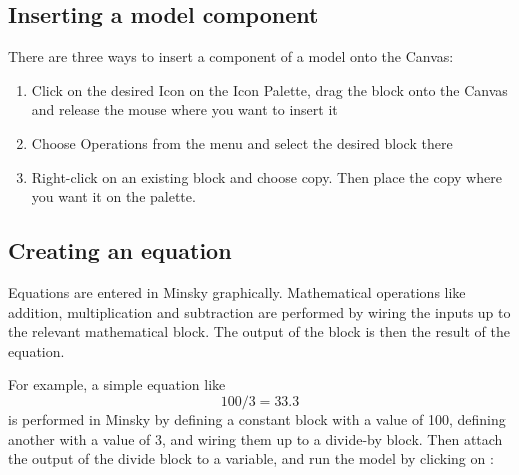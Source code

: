\subsection{Inserting a model component}


There are three ways to insert a component of a model onto the Canvas:
\begin{enumerate}
\item Click on the desired Icon on the Icon Palette, drag the block
onto the Canvas and release the mouse where you want to insert it 

\begin{center}
\end{center}

\item Choose Operations from the menu and select the desired block there

\begin{center}
\end{center}

\item Right-click on an existing block and choose copy. Then place the
copy where you want it on the palette. 

\begin{center}
\end{center}


\end{enumerate}

\subsection{Creating an equation}

Equations are entered in Minsky graphically. Mathematical operations
like addition, multiplication and subtraction are performed by wiring
the inputs up to the relevant mathematical block. The output of the
block is then the result of the equation. 

For example, a simple equation like
\begin{displaymath}
100/3 = 33.3
\end{displaymath}
is performed in Minsky by defining a constant block with a value of 100, defining another with a value of 3, and wiring them up to a divide-by block. Then attach the output of the divide block to a variable, and run the model by clicking on :


